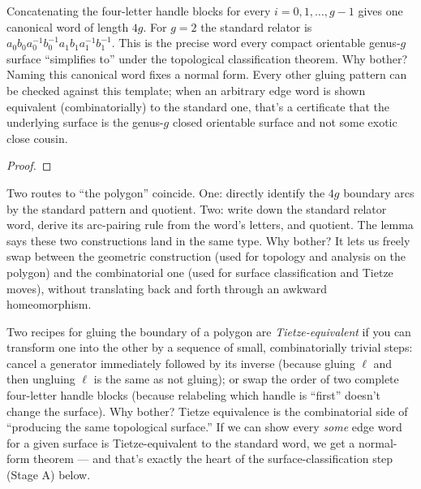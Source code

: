 \begin{layman}
Concatenating the four-letter handle blocks for every
\(i=0,1,\ldots,g-1\) gives one canonical word of length \(4g\). For
\(g=2\) the standard relator is \(a_0 b_0 a_0^{-1} b_0^{-1}
a_1 b_1 a_1^{-1} b_1^{-1}\). This is the precise word every compact
orientable genus-\(g\) surface ``simplifies to'' under the topological
classification theorem. Why bother? Naming this canonical word fixes
a normal form. Every other gluing pattern can be checked against
this template; when an arbitrary edge word is shown equivalent
(combinatorially) to the standard one, that's a certificate that the
underlying surface is the genus-\(g\) closed orientable
surface and not some exotic close cousin.
\end{layman}


\begin{proof}\leanok\end{proof}

\begin{layman}
Two routes to ``the polygon'' coincide. One: directly identify the
\(4g\) boundary arcs by the standard pattern and quotient. Two:
write down the standard relator word, derive its arc-pairing rule
from the word's letters, and quotient. The lemma says these two
constructions land in the same type. Why bother? It lets us freely
swap between the geometric construction (used for topology and
analysis on the polygon) and the combinatorial one (used for surface
classification and Tietze moves), without translating back and forth
through an awkward homeomorphism.
\end{layman}



\begin{layman}
Two recipes for gluing the boundary of a polygon are
\emph{Tietze-equivalent} if you can transform one into the other by
a sequence of small, combinatorially trivial steps: cancel a
generator immediately followed by its inverse (because gluing
\(\ell\) and then ungluing \(\ell\) is the same as not gluing); or
swap the order of two complete four-letter handle blocks (because
relabeling which handle is ``first'' doesn't change the surface).
Why bother? Tietze equivalence is the combinatorial side of
``producing the same topological surface.'' If we can show every
\emph{some} edge word for a given surface is Tietze-equivalent to the
standard word, we get a normal-form theorem --- and that's exactly the
heart of the surface-classification step (Stage A) below.
\end{layman}

